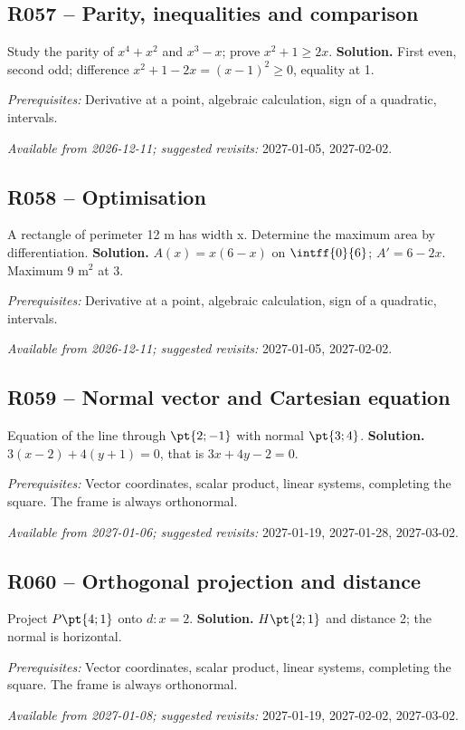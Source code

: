 \subsection*{R057 -- Parity, inequalities and comparison}\label{R057}
Study the parity of $x^4+x^2$ and $x^3-x$; prove $x^2+1\geq2x$.
\ifmxteacher\textbf{Solution.} First even, second odd; difference $x^2+1-2x=(x-1)^2\geq0$, equality at 1.\par\textit{Prerequisites:} Derivative at a point, algebraic calculation, sign of a quadratic, intervals.\par\textit{Available from 2026-12-11; suggested revisits:} 2027-01-05, 2027-02-02.\fi
{}\subsection*{R058 -- Optimisation}\label{R058}
A rectangle of perimeter 12 m has width x. Determine the maximum area by differentiation.
\ifmxteacher\textbf{Solution.} $A(x)=x(6-x)$ on $\intff{0}{6}$; $A\prime=6-2x$. Maximum 9 m$^2$ at 3.\par\textit{Prerequisites:} Derivative at a point, algebraic calculation, sign of a quadratic, intervals.\par\textit{Available from 2026-12-11; suggested revisits:} 2027-01-05, 2027-02-02.\fi
{}\subsection*{R059 -- Normal vector and Cartesian equation}\label{R059}
Equation of the line through $\pt{2;-1}$ with normal $\pt{3;4}$.
\ifmxteacher\textbf{Solution.} $3(x-2)+4(y+1)=0$, that is $3x+4y-2=0$.\par\textit{Prerequisites:} Vector coordinates, scalar product, linear systems, completing the square. The frame is always orthonormal.\par\textit{Available from 2027-01-06; suggested revisits:} 2027-01-19, 2027-01-28, 2027-03-02.\fi
{}\subsection*{R060 -- Orthogonal projection and distance}\label{R060}
Project $P\pt{4;1}$ onto $d:x=2$.
\ifmxteacher\textbf{Solution.} $H\pt{2;1}$ and distance 2; the normal is horizontal.\par\textit{Prerequisites:} Vector coordinates, scalar product, linear systems, completing the square. The frame is always orthonormal.\par\textit{Available from 2027-01-08; suggested revisits:} 2027-01-19, 2027-02-02, 2027-03-02.\fi
